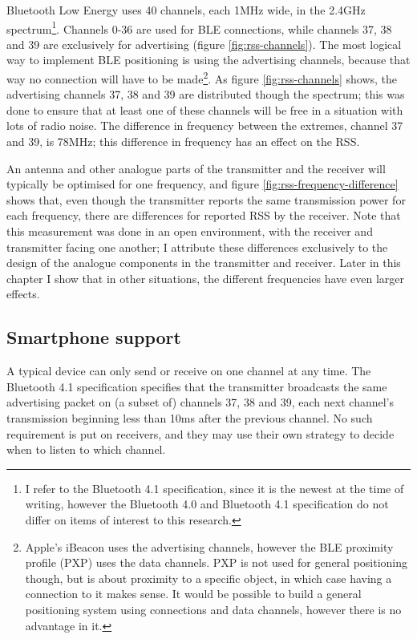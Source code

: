 Bluetooth Low Energy uses 40 channels, each 1MHz wide, in the 2.4GHz spectrum\citep{bluetooth41spec}\footnote{I refer to the Bluetooth 4.1 specification, since it is the newest at the time of writing, however the Bluetooth 4.0 and Bluetooth 4.1 specification do not differ on items of interest to this research.}.
Channels 0-36 are used for BLE connections, while channels 37, 38 and 39 are exclusively for advertising (figure \ref{fig:rss-channels}).
The most logical way to implement BLE positioning is using the advertising channels, because that way no connection will have to be made\footnote{Apple's iBeacon uses the advertising channels, however the BLE proximity profile (PXP) uses the data channels. PXP is not used for general positioning though, but is about proximity to a specific object, in which case having a connection to it makes sense. It would be possible to build a general positioning system using connections and data channels, however there is no advantage in it.}.
As figure \ref{fig:rss-channels} shows, the advertising channels 37, 38 and 39 are distributed though the spectrum; this was done to ensure that at least one of these channels will be free in a situation with lots of radio noise.
The difference in frequency between the extremes, channel 37 and 39, is 78MHz; this difference in frequency has an effect on the RSS.

An antenna and other analogue parts of the transmitter and the receiver will typically be optimised for one frequency, and figure \ref{fig:rss-frequency-difference} shows that, even though the transmitter reports the same transmission power for each frequency, there are differences for reported RSS by the receiver.
Note that this measurement was done in an open environment, with the receiver and transmitter facing one another; I attribute these differences exclusively to the design of the analogue components in the transmitter and receiver.
Later in this chapter I show that in other situations, the different frequencies have even larger effects.

\subsection{Smartphone support}
A typical device can only send or receive on one channel at any time.
The Bluetooth 4.1 specification \citep{bluetooth41spec} specifies that the transmitter broadcasts the same advertising packet on (a subset of) channels 37, 38 and 39, each next channel's transmission beginning less than 10ms after the previous channel. 
No such requirement is put on receivers, and they may use their own strategy to decide when to listen to which channel.


